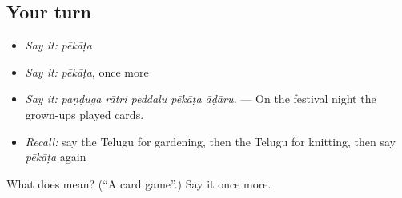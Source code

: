 \subsection*{Your turn}
\begin{itemize}
\raggedright
  \item \emph{Say it:} \emph{pēkāṭa}
  \item \emph{Say it:} \emph{pēkāṭa}, once more
  \item \emph{Say it:} \emph{paṇḍuga rātri peddalu pēkāṭa āḍāru.} — On the festival night the grown-ups played cards.
  \item \emph{Recall:} say the Telugu for gardening, then the Telugu for knitting, then say \emph{pēkāṭa} again
\end{itemize}

\begin{tcolorbox}[breakable,colback=teal!4,colframe=teal!35!black,title={Before you move on}]
What does  mean? (\textquotedblleft{}A card game\textquotedblright{}.) Say it once more.
\end{tcolorbox}
